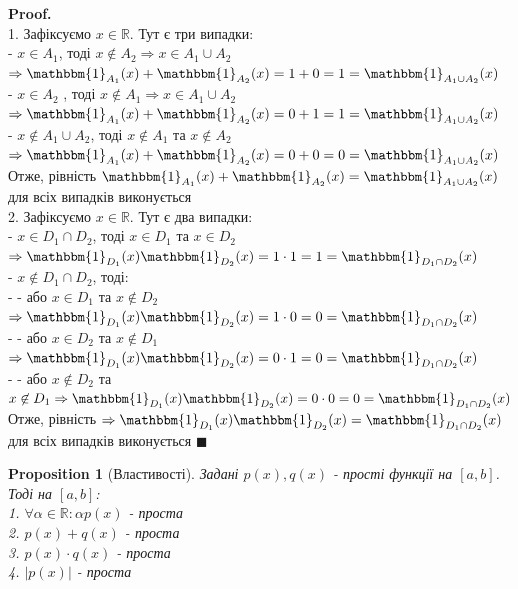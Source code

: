 \documentclass[a4paper, 14pt]{extarticle}
\def\bigline{\vspace{5mm}\\}
\theoremstyle{theoremdd}
\theoremstyle{theoremdd}
\theoremstyle{theoremdd}
\theoremstyle{theoremdd}
\theoremstyle{theoremdd}
\newtheorem{proposition}[theorem]{Proposition}
\theoremstyle{theoremdd}
\theoremstyle{theoremdd}
\theoremstyle{theoremdd}
\newenvironment{pf}{\vspace*{-3mm} \textbf{Proof. \\}}{$\blacksquare$}
\begin{document}
\begin{pf}
1. Зафіксуємо $x \in \mathbb{R}$. Тут є три випадки:\\
- $x \in A_1$, тоді $x \not\in A_2 \Rightarrow x \in A_1 \cup A_2$ \\ $\Rightarrow \mathbbm{1}_{A_1}(x) + \mathbbm{1}_{A_2}(x) = 1 + 0 = 1 = \mathbbm{1}_{A_1 \cup A_2}(x)$\\
- $x \in A_2$ , тоді $x \not\in A_1 \Rightarrow x \in A_1 \cup A_2$ \\ $\Rightarrow \mathbbm{1}_{A_1}(x) + \mathbbm{1}_{A_2}(x) = 0 + 1 = 1 = \mathbbm{1}_{A_1 \cup A_2}(x)$\\
- $x \not\in A_1 \cup A_2$, тоді $x \not\in A_1$ та $x \not\in A_2$ \\ $\Rightarrow \mathbbm{1}_{A_1}(x) + \mathbbm{1}_{A_2}(x) = 0 + 0 = 0 = \mathbbm{1}_{A_1 \cup A_2}(x)$\\
Отже, рівність $\mathbbm{1}_{A_1}(x) + \mathbbm{1}_{A_2}(x) = \mathbbm{1}_{A_1 \cup A_2}(x)$ для всіх випадків виконується
\bigline
2. Зафіксуємо $x \in \mathbb{R}$. Тут є два випадки:\\
- $x \in D_1 \cap D_2$, тоді $x \in D_1$ та $x \in D_2$\\
$\Rightarrow \mathbbm{1}_{D_1}(x) \mathbbm{1}_{D_2}(x) = 1 \cdot 1 = 1 = \mathbbm{1}_{D_1 \cap D_2}(x)$\\
- $x \not \in D_1 \cap D_2$, тоді:\\
- - або $x \in D_1$ та $x \not\in D_2$ $\Rightarrow \mathbbm{1}_{D_1}(x) \mathbbm{1}_{D_2}(x) = 1 \cdot 0 = 0 = \mathbbm{1}_{D_1 \cap D_2}(x)$\\
- - або $x \in D_2$ та $x \not\in D_1$ $\Rightarrow \mathbbm{1}_{D_1}(x) \mathbbm{1}_{D_2}(x) = 0 \cdot 1 = 0 = \mathbbm{1}_{D_1 \cap D_2}(x)$\\
- - або $x \not\in D_2$ та $x \not\in D_1 \Rightarrow \mathbbm{1}_{D_1}(x) \mathbbm{1}_{D_2}(x) = 0 \cdot 0 = 0 = \mathbbm{1}_{D_1 \cap D_2}(x)$\\
Отже, рівність $\Rightarrow \mathbbm{1}_{D_1}(x) \mathbbm{1}_{D_2}(x) = \mathbbm{1}_{D_1 \cap D_2}(x)$ для всіх випадків виконується
\end{pf}

\begin{proposition}[Властивості]
Задані $p(x),q(x)$ - прості функції на $[a,b]$. Тоді на $[a,b]$:\\
1. $\forall \alpha \in \mathbb{R}: \alpha p(x)$ - проста\\
2. $p(x) + q(x)$ - проста\\
3. $p(x) \cdot q(x)$ - проста\\
4. $|p(x)|$ - проста
\end{proposition}
\end{document}
